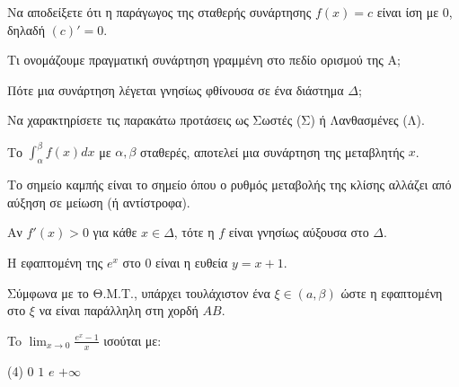 \documentclass[11pt,a4paper]{article}
\newcommand{\kerkissans}[1]{{\fontfamily{maksf}\selectfont \textbf{#1}}}
\renewcommand{\textdexiakeraia}{}
\newcommand{\dint}{\displaystyle\int}
\newcommand\themanum{A}
\newcounter{thema}[section]
\renewcommand{\thethema}{\arabic{thema}}
\newcommand{\Thema}{\refstepcounter{thema}{\textbf{\textcolor{black}{\faPenSquare\ \  \large \kerkissans{\textbf{\thethemaο\hspace{2mm}Διαγώνισμα - Θέμα \themanum}}}}}\hspace{0mm}}{}
\newenvironment{thema}[1]
{\begin{tcolorbox}[title=\Thema\kerkissans{\textbf{\large{  #1}}},breakable,
enhanced standard,titlerule=0pt,toprule=0pt, rightrule=0pt, bottomrule=0pt,
colback=white,left=0mm,top=1mm,bottom=0mm,
boxrule=0pt,
colframe=white,leftrule=0mm,sharp corners,coltitle=black]
\renewcommand{\themanum}{#1}}
{\end{tcolorbox}}
\begin{document}
\begin{thema}{A}
\begin{erwthma}
    \item Να αποδείξετε ότι η παράγωγος της σταθερής συνάρτησης $f(x) = c$ είναι ίση με $0$, δηλαδή $(c)' = 0$.
    \item Τι ονομάζουμε πραγματική συνάρτηση γραμμένη στο πεδίο ορισμού της Α;
    \item Πότε μια συνάρτηση λέγεται γνησίως φθίνουσα σε ένα διάστημα $\Delta$;
    \item Να χαρακτηρίσετε τις παρακάτω προτάσεις ως Σωστές (Σ) ή Λανθασμένες (Λ).
    \begin{alist}
        \item Το $\dint_{\alpha}^{\beta} f(x) dx$ με $\alpha, \beta$ σταθερές, αποτελεί μια συνάρτηση της μεταβλητής $x$.
        \item Το σημείο καμπής είναι το σημείο όπου ο ρυθμός μεταβολής της κλίσης αλλάζει από αύξηση σε μείωση (ή αντίστροφα).
        \item Αν $f'(x) > 0$ για κάθε $x \in \Delta$, τότε η $f$ είναι γνησίως αύξουσα στο $\Delta$.
        \item Η εφαπτομένη της $e^x$ στο 0 είναι η ευθεία $y=x+1$.
        \item Σύμφωνα με το Θ.Μ.Τ., υπάρχει τουλάχιστον ένα $\xi \in (a, \beta)$ ώστε η εφαπτομένη στο $\xi$ να είναι παράλληλη στη χορδή $AB$.
    \end{alist}
    \item To $\displaystyle\lim_{x\to 0} \frac{e^x - 1}{x}$ ισούται με:
    \begin{tasks}[label=\let\textdexiakeraia\relax\alph*.](4)
        \task $0$
        \task $1$
        \task $e$
        \task $+\infty$
    \end{tasks}
\end{erwthma}
\end{thema}
\vspace{1cm}
\end{document}
